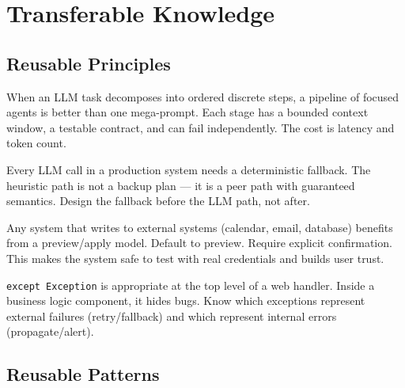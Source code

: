 \documentclass[12pt, a4paper]{article}
\begin{document}
\section{Transferable Knowledge}

\subsection{Reusable Principles}

\begin{keybox}
  When an LLM task decomposes into ordered discrete steps, a pipeline of focused agents is better than one mega-prompt. Each stage has a bounded context window, a testable contract, and can fail independently. The cost is latency and token count.
\end{keybox}

\begin{keybox}
  Every LLM call in a production system needs a deterministic fallback. The heuristic path is not a backup plan --- it is a peer path with guaranteed semantics. Design the fallback before the LLM path, not after.
\end{keybox}

\begin{keybox}
  Any system that writes to external systems (calendar, email, database) benefits from a preview/apply model. Default to preview. Require explicit confirmation. This makes the system safe to test with real credentials and builds user trust.
\end{keybox}

\begin{keybox}
  \texttt{except Exception} is appropriate at the top level of a web handler. Inside a business logic component, it hides bugs. Know which exceptions represent external failures (retry/fallback) and which represent internal errors (propagate/alert).
\end{keybox}

\subsection{Reusable Patterns}
\end{document}
